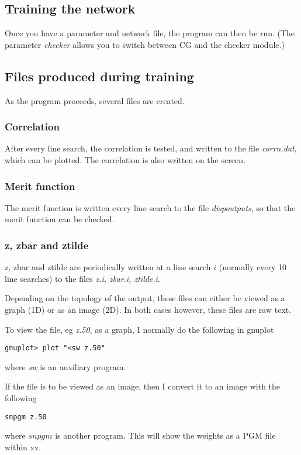 \documentclass[a4paper]{article}
\begin{document}
\subsection{Training the network}

Once you have a parameter and network file, the program can then be
run.  (The parameter {\it checker} allows you to switch between CG and
the checker module.)

\subsection{Files produced during training}
As the program proceeds, several files are created.  

\subsubsection{Correlation}
After every line search, the correlation is tested, and written to the
file {\it corrn.dat}, which can be plotted. The correlation is also
written on the screen.

\subsubsection{Merit function}

The merit function is written every line search to the file
\textit{dispoutputs}, so that the merit function can be checked.

\subsubsection{z, zbar and ztilde}

z, zbar and ztilde are periodically written at a  line search $i$
(normally every 10 line searches) to
the files \textit{z.i, zbar.i, ztilde.i}.  

Depending on the topology of the output, these files can either be
viewed as a graph (1D) or as an image (2D).  In both cases however,
these files are raw text.

To view the file, eg \textit{z.50}, as a graph, I normally do the
following in gnuplot
\begin{verbatim}
gnuplot> plot "<sw z.50"
\end{verbatim}
where \textit{sw} is an auxiliary program.

If the file is to be viewed as an image, then I convert it to an image with
the following
\begin{verbatim}
snpgm z.50
\end{verbatim}
where $snpgm$ is another program.  This will show the weights as a PGM
file within xv.
\end{document}
